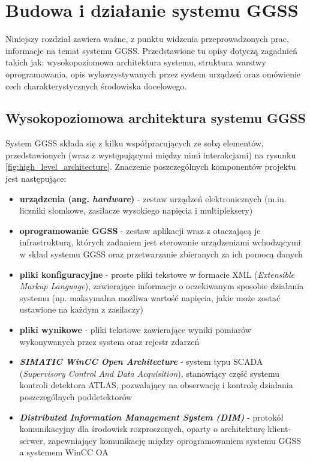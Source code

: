 \chapter{Budowa i działanie systemu GGSS}
\label{cha:ggss}

Niniejszy rozdział zawiera ważne, z punktu widzenia przeprowadzonych prac, informacje na temat systemu GGSS. Przedstawione tu opisy dotyczą zagadnień takich jak: wysokopoziomowa architektura systemu, struktura warstwy oprogramowania, opis wykorzystywanych przez system urządzeń oraz omówienie cech charakterystycznych środowiska docelowego. 


\section{Wysokopoziomowa architektura systemu GGSS}
System GGSS składa się z kilku współpracujących ze sobą elementów, przedstawionych (wraz z występującymi między nimi interakcjami) na rysunku \ref{fig:high_level_architecture}. Znaczenie poszczególnych komponentów projektu jest następujące:
\begin{itemize}
    \item \textbf{urządzenia (ang. \emph{hardware})} - zestaw urządzeń elektronicznych (m.in. liczniki słomkowe, zasilacze wysokiego napięcia i multipleksery)
    \item \textbf{oprogramowanie GGSS} - zestaw aplikacji wraz z otaczającą je infrastrukturą, których zadaniem jest sterowanie urządzeniami wchodzącymi w skład systemu GGSS oraz przetwarzanie zbieranych za ich pomocą danych
    \item \textbf{pliki konfiguracyjne} - proste pliki tekstowe w formacie XML (\emph{Extensible Markup Language}), zawierające informacje o oczekiwanym sposobie działania systemu (np. maksymalna możliwa wartość napięcia, jakie może zostać ustawione na każdym z zasilaczy)
    \item \textbf{pliki wynikowe} - pliki tekstowe zawierające wyniki pomiarów wykonywanych przez system oraz rejestr zdarzeń 
    \item \emph{\textbf{SIMATIC WinCC Open Architecture}} - system typu SCADA (\emph{Supervisory Control And Data Acquisition}), stanowiący część systemu kontroli detektora ATLAS, pozwalający na obserwację i kontrolę działania poszczególnych poddetektorów
    \item \emph{\textbf{Distributed Information Management System (DIM)}} - protokół komunikacyjny dla środowisk rozproszonych, oparty o architekturę klient-serwer, zapewniający komunikację między oprogramowaniem systemu GGSS a systemem WinCC OA
\end{itemize}

